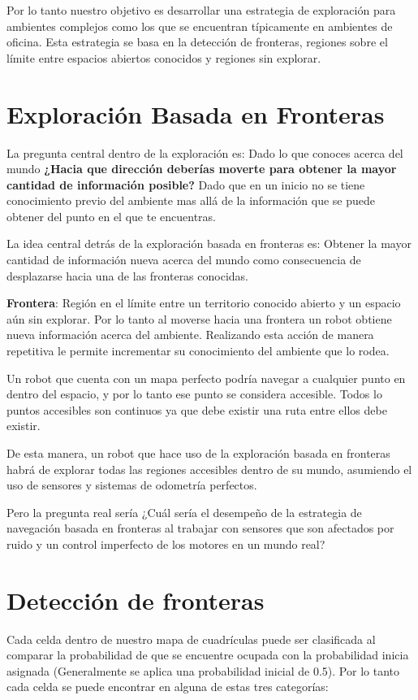 \documentclass[12pt]{article}
\begin{document}
Por lo tanto nuestro objetivo es desarrollar una estrategia de exploración para ambientes complejos como los que se encuentran típicamente en ambientes de oficina. Esta estrategia se basa en la detección de fronteras, regiones sobre el límite entre espacios abiertos conocidos y regiones sin explorar.

\section{Exploración Basada en Fronteras}

La pregunta central dentro de la exploración es: Dado lo que conoces acerca del mundo \textbf{¿Hacia que dirección deberías moverte para obtener la mayor cantidad de información posible?} Dado que en un inicio no se tiene conocimiento previo del ambiente mas allá de la información que se puede obtener del punto en el que te encuentras.

La idea central detrás de la exploración basada en fronteras es: Obtener la mayor cantidad de información nueva acerca del mundo como consecuencia de desplazarse hacia una de las fronteras conocidas.

\textbf{Frontera}: Región en el límite entre un territorio conocido abierto y un espacio aún sin explorar. Por lo tanto al moverse hacia una frontera un robot obtiene nueva información acerca del ambiente. Realizando esta acción de manera repetitiva le permite incrementar su conocimiento del ambiente que lo rodea.

Un robot que cuenta con un mapa perfecto podría navegar a cualquier punto en dentro del espacio, y por lo tanto ese punto se considera accesible. Todos lo puntos accesibles son continuos ya que debe existir una ruta entre ellos debe existir. 

De esta manera, un robot que hace uso de la exploración basada en fronteras habrá de explorar todas las regiones accesibles dentro de su mundo, asumiendo el uso de sensores y sistemas de odometría perfectos.

Pero la pregunta real sería ¿Cuál sería el desempeño de la estrategia de navegación basada en fronteras al trabajar con sensores que son afectados por ruido y un control imperfecto de los motores en un mundo real?

\section{Detección de fronteras}

Cada celda dentro de nuestro mapa de cuadrículas puede ser clasificada al comparar la probabilidad de que se encuentre ocupada con la probabilidad inicia asignada (Generalmente se aplica una probabilidad inicial de 0.5). Por lo tanto cada celda se puede encontrar en alguna de estas tres categorías:
\end{document}
